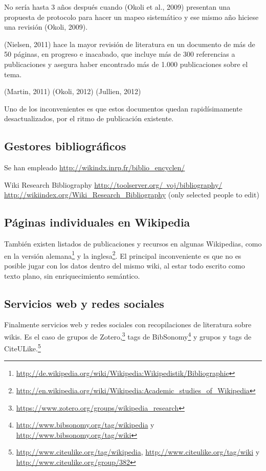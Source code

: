 \documentclass[twoside]{article}
\begin{document}
\begin{multicols}{2}
No ser\'{i}a hasta 3 a\~{n}os despu\'{e}s cuando (Okoli et al., 2009) presentan una propuesta de protocolo para hacer un mapeo sistem\'{a}tico y ese mismo a\~{n}o hiciese una revisi\'{o}n (Okoli, 2009).

(Nielsen, 2011) hace la mayor revisi\'{o}n de literatura en un documento de m\'{a}s de 50 p\'{a}ginas, en progreso e inacabado, que incluye m\'{a}s de 300 referencias a publicaciones y asegura haber encontrado m\'{a}s de 1.000 publicaciones sobre el tema.

(Martin, 2011)
(Okoli, 2012)
(Jullien, 2012)

Uno de los inconvenientes es que estos documentos quedan rapid\'{i}simamente desactualizados, por el ritmo de publicaci\'{o}n existente.

\subsection{Gestores bibliogr\'{a}ficos}
Se han empleado \href{http://wikindx.inrp.fr/biblio_encyclen/}{http://wikindx.inrp.fr/biblio\_encyclen/}

Wiki Research Bibliography
\href{http://toolserver.org/~voj/bibliography/}{http://toolserver.org/~voj/bibliography/}
\href{http://wikiindex.org/Wiki_Research_Bibliography}{http://wikiindex.org/Wiki\_Research\_Bibliography}
(only selected people to edit)

\subsection{P\'{a}ginas individuales en Wikipedia}
Tambi\'{e}n existen listados de publicaciones y recursos en algunas Wikipedias, como en la versi\'{o}n alemana\footnote{\href{http://de.wikipedia.org/wiki/Wikipedia:Wikipedistik/Bibliographie}{http://de.wikipedia.org/wiki/Wikipedia:Wikipedistik/Bibliographie}} y la inglesa\footnote{\href{http://en.wikipedia.org/wiki/Wikipedia:Academic_studies_of_Wikipedia}{http://en.wikipedia.org/wiki/Wikipedia:Academic\_studies\_of\_Wikipedia}}. El principal inconveniente es que no es posible jugar con los datos dentro del mismo wiki, al estar todo escrito como texto plano, sin enriquecimiento sem\'{a}ntico.

\subsection{Servicios web y redes sociales}
Finalmente servicios web y redes sociales con recopilaciones de literatura sobre wikis. Es el caso de grupos de Zotero,\footnote{\href{https://www.zotero.org/groups/wikipedia_research}{https://www.zotero.org/groups/wikipedia\_research}} tags de BibSonomy\footnote{\href{http://www.bibsonomy.org/tag/wikipedia}{http://www.bibsonomy.org/tag/wikipedia} y \href{http://www.bibsonomy.org/tag/wiki}{http://www.bibsonomy.org/tag/wiki}} y grupos y tags de CiteULike.\footnote{\href{http://www.citeulike.org/tag/wikipedia}{http://www.citeulike.org/tag/wikipedia}, \href{http://www.citeulike.org/tag/wiki}{http://www.citeulike.org/tag/wiki} y \href{http://www.citeulike.org/group/382}{http://www.citeulike.org/group/382}}


\end{multicols}
\end{document}
